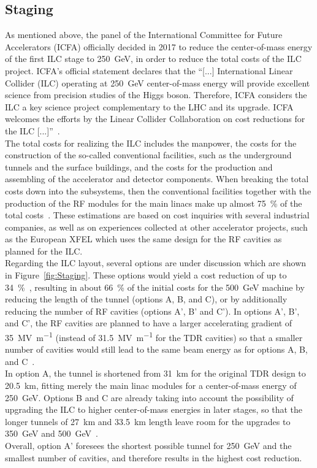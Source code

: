 \subsection{Staging}
\label{ILC:layout:staging}
As mentioned above, the panel of the International Committee for Future Accelerators (ICFA) officially decided in 2017 to reduce the center-of-mass energy of the first ILC stage to \SI{250}{\GeV}, in order to reduce the total costs of the ILC project.
ICFA's official statement declares that the ``[...] International Linear Collider (ILC) operating at \SI{250}{\GeV} center-of-mass energy will provide excellent science from precision studies of the Higgs boson.
Therefore, ICFA considers the ILC a key science project complementary to the LHC and its upgrade.
ICFA welcomes the efforts by the Linear Collider Collaboration on cost reductions for the ILC [...]''~\cite{ICFA_Statement}.\\
The total costs for realizing the ILC includes the manpower, the costs for the construction of the so-called conventional facilities, such as the underground tunnels and the surface buildings, and the costs for the production and assembling of the accelerator and detector components.
When breaking the total costs down into the subsystems, then the conventional facilities together with the production of the RF modules for the main linacs make up almost \SI{75}{\percent} of the total costs~\cite[p. 20f]{TDR1}.
These estimations are based on cost inquiries with several industrial companies, as well as on experiences collected at other accelerator projects, such as the European XFEL which uses the same design for the RF cavities as planned for the ILC.\\
Regarding the ILC layout, several options are under discussion which are shown in Figure~\ref{fig:Staging}.
These options would yield a cost reduction of up to \SI{34}{\percent}~\cite{Cost_reduction}, resulting in about \SI{66}{\percent} of the initial costs for the \SI{500}{\GeV} machine by reducing the length of the tunnel (options A, B, and C), or by additionally reducing the number of RF cavities (options A', B' and C').
In options A', B', and C', the RF cavities are planned to have a larger accelerating gradient of \SI{35}{\mega\volt\per\meter} (instead of \SI{31.5}{\mega\volt\per\meter} for the TDR cavities) so that a smaller number of cavities would still lead to the same beam energy as for options A, B, and C~\cite[p. 19]{Staging}.
\\In option A, the tunnel is shortened from \SI{31}{\kilo\meter} for the original TDR design to \SI{20.5}{\kilo\meter}, fitting merely the main linac modules for a center-of-mass energy of \SI{250}{\GeV}.
Options B and C are already taking into account the possibility of upgrading the ILC to higher center-of-mass energies in later stages, so that the longer tunnels of \SI{27}{\kilo\meter} and \SI{33.5}{\kilo\meter} length leave room for the upgrades to \SI{350}{\GeV} and \SI{500}{\GeV}~\cite[p. 19]{Staging}. 
\\Overall, option A' foresees the shortest possible tunnel for \SI{250}{\GeV} and the smallest number of cavities, and therefore results in the highest cost reduction.

